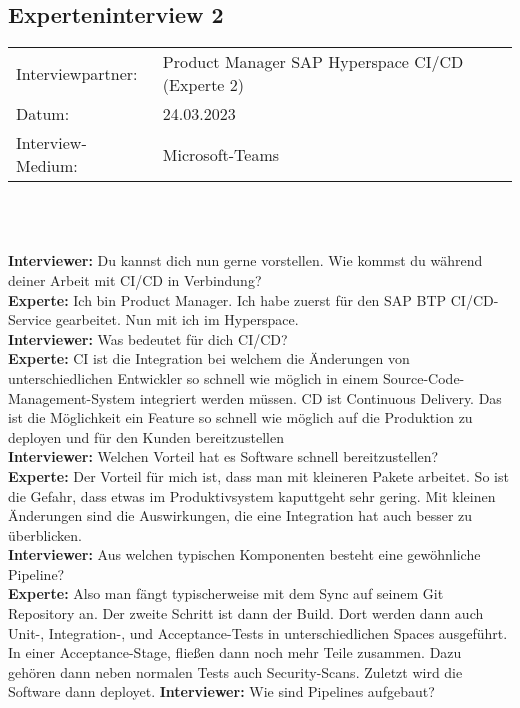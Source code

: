 \subsection{Experteninterview 2}
	\begin{tabular}{ l l }
		Interviewpartner: & Product Manager SAP Hyperspace CI/CD (Experte 2)\\
		Datum: & 24.03.2023\\
		Interview-Medium: & Microsoft-Teams\\
\end{tabular}\\\\
\begin{linenumbers}
    \textbf{Interviewer:} Du kannst dich nun gerne vorstellen. Wie kommst du während deiner Arbeit mit CI/CD in Verbindung?\\
    \textbf{Experte:} Ich bin Product Manager. Ich habe zuerst für den SAP BTP CI/CD-Service gearbeitet. Nun mit ich im Hyperspace.\\
    \textbf{Interviewer:} Was bedeutet für dich CI/CD?\\
    \textbf{Experte:} CI ist die Integration bei welchem die Änderungen von unterschiedlichen Entwickler so schnell wie möglich in einem Source-Code-Management-System integriert werden müssen. CD ist Continuous Delivery. Das ist die Möglichkeit ein Feature so schnell wie möglich auf die Produktion zu deployen und für den Kunden bereitzustellen\\
    \textbf{Interviewer:} Welchen Vorteil hat es Software schnell bereitzustellen?\\
    \textbf{Experte:} Der Vorteil für mich ist, dass man mit kleineren Pakete arbeitet. So ist die Gefahr, dass etwas im Produktivsystem kaputtgeht sehr gering. Mit kleinen Änderungen sind die Auswirkungen, die eine Integration hat auch besser zu überblicken.\\
    \textbf{Interviewer:} Aus welchen typischen Komponenten besteht eine gewöhnliche Pipeline?\\
    \textbf{Experte:} Also man fängt typischerweise mit dem Sync auf seinem Git Repository an. Der zweite Schritt ist dann der Build. Dort werden dann auch Unit-, Integration-, und Acceptance-Tests in unterschiedlichen Spaces ausgeführt. In einer Acceptance-Stage, fließen dann noch mehr Teile zusammen. Dazu gehören dann neben normalen Tests auch Security-Scans. Zuletzt wird die Software dann deployet.
    \textbf{Interviewer:} Wie sind Pipelines aufgebaut?\\

\end{linenumbers}
